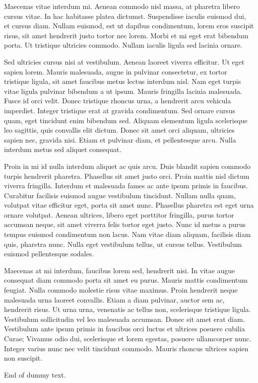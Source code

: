 Maecenas vitae interdum mi. Aenean commodo nisl massa, at pharetra
libero cursus vitae. In hac habitasse platea dictumst. Suspendisse
iaculis euismod dui, et cursus diam. Nullam euismod, est ut dapibus
condimentum, lorem eros suscipit risus, sit amet hendrerit justo
tortor nec lorem. Morbi et mi eget erat bibendum porta. Ut tristique
ultricies commodo. Nullam iaculis ligula sed lacinia ornare.

Sed ultricies cursus nisi at vestibulum. Aenean laoreet viverra
efficitur. Ut eget sapien lorem. Mauris malesuada, augue in pulvinar
consectetur, ex tortor tristique ligula, sit amet faucibus metus
lectus interdum nisl. Nam eget turpis vitae ligula pulvinar bibendum a
ut ipsum. Mauris fringilla lacinia malesuada. Fusce id orci
velit. Donec tristique rhoncus urna, a hendrerit arcu vehicula
imperdiet. Integer tristique erat at gravida condimentum. Sed ornare
cursus quam, eget tincidunt enim bibendum sed. Aliquam elementum
ligula scelerisque leo sagittis, quis convallis elit dictum. Donec sit
amet orci aliquam, ultricies sapien nec, gravida nisi. Etiam et
pulvinar diam, et pellentesque arcu. Nulla interdum metus sed aliquet
consequat.

Proin in mi id nulla interdum aliquet ac quis arcu. Duis blandit
sapien commodo turpis hendrerit pharetra. Phasellus sit amet justo
orci. Proin mattis nisl dictum viverra fringilla. Interdum et
malesuada fames ac ante ipsum primis in faucibus. Curabitur facilisis
euismod augue vestibulum tincidunt. Nullam nulla quam, volutpat vitae
efficitur eget, porta sit amet nunc. Phasellus pharetra est eget urna
ornare volutpat. Aenean ultrices, libero eget porttitor fringilla,
purus tortor accumsan neque, sit amet viverra felis tortor eget
justo. Nunc id metus a purus tempus euismod condimentum non lacus. Nam
vitae diam aliquam, facilisis diam quis, pharetra nunc. Nulla eget
vestibulum tellus, ut cursus tellus. Vestibulum euismod pellentesque
sodales.

Maecenas at mi interdum, faucibus lorem sed, hendrerit nisi. In vitae
augue consequat diam commodo porta sit amet eu purus. Mauris mattis
condimentum feugiat. Nulla commodo molestie risus vitae maximus. Proin
hendrerit neque malesuada urna laoreet convallis. Etiam a diam
pulvinar, auctor sem ac, hendrerit risus. Ut urna urna, venenatis ac
tellus non, scelerisque tristique ligula. Vestibulum sollicitudin vel
leo malesuada accumsan. Donec sit amet erat diam. Vestibulum ante
ipsum primis in faucibus orci luctus et ultrices posuere cubilia
Curae; Vivamus odio dui, scelerisque et lorem egestas, posuere
ullamcorper nunc. Integer varius nunc nec velit tincidunt
commodo. Mauris rhoncus ultrices sapien non suscipit.


End of dummy text.


\endinput